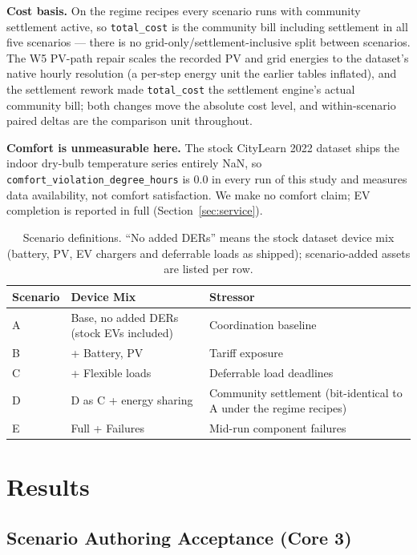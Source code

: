 \documentclass[11pt,a4paper]{article}
\begin{document}
\textbf{Cost basis.} On the regime recipes every scenario runs with community
settlement active, so \texttt{total\_cost} is the community bill including
settlement in all five scenarios --- there is no grid-only/settlement-inclusive
split between scenarios. The W5 PV-path repair scales the recorded PV and grid
energies to the dataset's native hourly resolution (a per-step energy unit the
earlier tables inflated), and the settlement rework made \texttt{total\_cost}
the settlement engine's actual community bill; both changes move the absolute
cost level, and within-scenario paired deltas are the comparison unit
throughout.

\textbf{Comfort is unmeasurable here.} The stock CityLearn 2022 dataset ships
the indoor dry-bulb temperature series entirely NaN, so
\texttt{comfort\_violation\_degree\_hours} is $0.0$ in every run of this study
and measures data availability, not comfort satisfaction. We make no comfort
claim; EV completion is reported in full (Section~\ref{sec:service}).

\begin{table}[htbp]
\centering
\caption{Scenario definitions. ``No added DERs'' means the stock dataset device
mix (battery, PV, EV chargers and deferrable loads as shipped); scenario-added
assets are listed per row.}
\label{tab:scenarios}
\begin{tabular}{lll}
\toprule
Scenario & Device Mix & Stressor \\
\midrule
A & Base, no added DERs (stock EVs included) & Coordination baseline \\
B & + Battery, PV & Tariff exposure \\
C & + Flexible loads & Deferrable load deadlines \\
D & D as C + energy sharing & Community settlement (bit-identical to A under the regime recipes) \\
E & Full + Failures & Mid-run component failures \\
\bottomrule
\end{tabular}
\end{table}

\section{Results}
\label{sec:results}

\subsection{Scenario Authoring Acceptance (Core 3)}
\label{sec:authoring}
\end{document}
